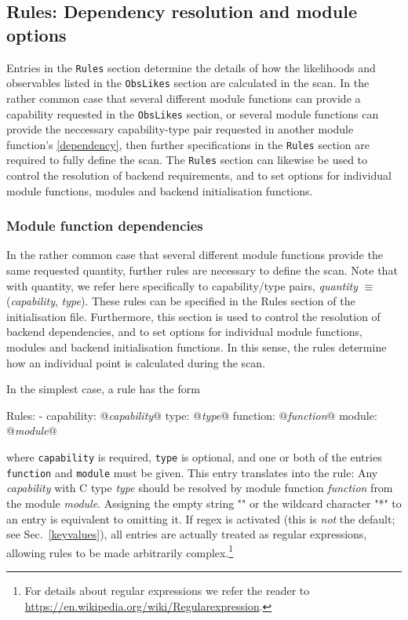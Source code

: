 \documentclass[pdftex,twocolumn,epjc3_preprint,runningheads]{svjour3}
\renewcommand{\_}{\discretionary{\underscore}{}{\underscore}}
\newcommand\yaml[1]{{\lstset{style=yaml}\lstinline!#1!\lstset{style=cpp}}}
\newcommand\yamlvalue[1]{{\YAMLvaluestyle\ttfamily#1}}
\newcommand\YAMLvaluestyle{\footnotesize\color{blue}\mdseries}
\newcommand{\cross}[1]{\ref{#1}}
\newcommand{\metavarf}[1]{\textit{\color{darkgreen}\footnotesize\textrm{#1}}}
\newcommand{\metavar}{\metavarf}
\newcommand\xx{\raisebox{0.2ex}{\smaller ++}\xspace}
\newcommand\Cpp{\textsf{C\xx}\xspace}
\renewcommand{\url}[1]{\href{#1}{#1}}
\begin{document}
\subsection{Rules: Dependency resolution and module options}
\label{Rules}

Entries in the \yaml{Rules} section determine the details of how the
likelihoods and observables listed in the
\yaml{ObsLikes} section are calculated in the scan.
In the rather common case that several different module functions can provide a capability
requested in the \yaml{ObsLikes} section, or several module functions can provide the neccessary
capability-type pair requested in another module function's \cross{dependency}, then
further specifications in the \yaml{Rules} section are required to fully define the scan.
The \yaml{Rules} section can likewise be used to control the
resolution of backend requirements, and to set options for individual module
functions, modules and backend initialisation functions.

\subsubsection{Module function dependencies}
\label{regular_dependencies}
In the rather common case that several different module functions provide the
same requested quantity, further rules are necessary to define the scan.  Note
that with quantity, we refer here specifically to capability/type pairs,
\metavar{quantity} $\equiv$ (\metavar{capability}, \metavar{type}).  These rules
can be specified in the \yamlvalue{Rules} section of the initialisation file.
Furthermore, this section is used to control the resolution of backend
dependencies, and to set options for individual module functions, modules and
backend initialisation functions.  In this sense, the rules determine how an
individual point is calculated during the scan.

In the simplest case, a rule has the form
%
\begin{lstyaml}
Rules:
  - capability: @\metavar{capability}@
    type: @\metavar{type}@
    function: @\metavar{function}@
    module: @\metavar{module}@
\end{lstyaml}
%
where \yaml{capability} is required, \yaml{type} is optional, and one
or both of the entries \yaml{function} and \yaml{module} must be
given.  This entry translates into the rule: Any \metavar{capability} with \Cpp
type \metavar{type} should be resolved by module function \metavar{function}
from the module \metavar{module}.  Assigning the empty string \yamlvalue{""} or the wildcard character \yamlvalue{"*"} to an
entry is equivalent to omitting it.  If regex is activated (this is
\textit{not} the default; see Sec.\ \ref{keyvalues}), all
entries are actually treated as regular expressions, allowing rules to be made
arbitrarily complex.\footnote{For details about regular expressions we refer the reader to
\url{https://en.wikipedia.org/wiki/Regular\_expression}.}
\end{document}
